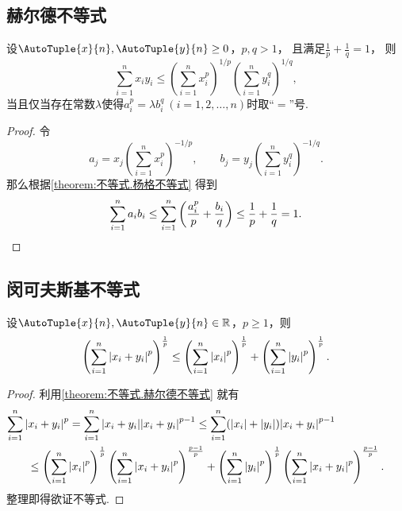 \subsection{赫尔德不等式}
\begin{theorem}[赫尔德不等式]\label{theorem:不等式.赫尔德不等式}
设\(\AutoTuple{x}{n},\AutoTuple{y}{n}\geq0\)，\(p,q>1\)，
且满足\(\frac{1}{p}+\frac{1}{q}=1\)，
则
\def\s{\sum_{i=1}^n}%
\def\sp#1#2#3{\left( \s #1^#2 \right)^{#3/#2}}%
\begin{equation}
	\s x_i y_i
	\leq
	\sp{x_i}{p}{1} \sp{y_i}{q}{1},
\end{equation}
当且仅当存在常数\(\lambda\)使得\(a_i^p = \lambda b_i^q\ (i=1,2,\dotsc,n)\)时取“\(=\)”号.
\begin{proof}
令\[
	a_j = x_j \sp{x_i}{p}{-1}, \qquad
	b_j = y_j \sp{y_i}{q}{-1}.
\]
那么根据\cref{theorem:不等式.杨格不等式} 得到\[
	\s a_i b_i \leq \s \left( \frac{a_i^p}{p} + \frac{b_i}{q} \right)
	\leq \frac{1}{p} + \frac{1}{q} = 1.
	\qedhere
\]
\end{proof}
\end{theorem}

\subsection{闵可夫斯基不等式}
\begin{theorem}[闵可夫斯基不等式]\label{theorem:不等式.闵可夫斯基不等式}
设\(\AutoTuple{x}{n},\AutoTuple{y}{n}\in\mathbb{R}\)，\(p\geq1\)，则
\def\s{\sum_{i=1}^n}%
\def\sumonly#1{\s \abs{#1}^p}%
\newcommand\sumpower[2][1]{\left( \sumonly{#2} \right)^{\frac{#1}{p}}}%
\begin{equation}
\sumpower{x_i+y_i} \leq \sumpower{x_i} + \sumpower{y_i}.
\end{equation}
\begin{proof}
利用\cref{theorem:不等式.赫尔德不等式} 就有\[\begin{aligned}
&\hspace{-20pt}\sumonly{x_i+y_i}
= \s \abs{x_i+y_i} \abs{x_i+y_i}^{p-1}
\leq \s (\abs{x_i}+\abs{y_i}) \abs{x_i+y_i}^{p-1} \\
&\leq \sumpower{x_i} \sumpower[p-1]{x_i+y_i}
+ \sumpower{y_i} \sumpower[p-1]{x_i+y_i}.
\end{aligned}\]
整理即得欲证不等式.
\end{proof}
\end{theorem}
